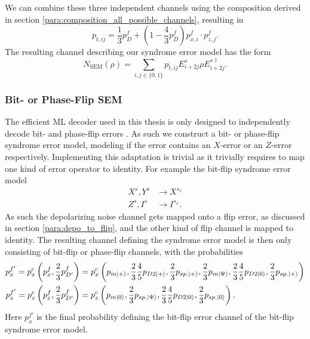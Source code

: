 We can combine these three independent channels using the composition derived in section \ref{para:composition_all_possible_channels}, resulting in 
\begin{equation}
    p_{t,ij} = \frac{1}{3} p_D^f + \left( 1- \frac{4}{3} p_D^f \right) p_{x,i}^f \cdot p_{z,j}^f.
    \label{eq:sem_final_correlated_sem_probs_short}
\end{equation}
The resulting channel describing our syndrome error model has the form
\begin{equation}
    N_{\mathrm{SEM}}(\rho) = \sum_{i,j\in \{0,1\}} p_{t,ij} E_{i+2j}^s \rho E_{i+2j}^{s\dag}.
\end{equation}




\subsubsection{Bit- or Phase-Flip SEM}\label{sssec:sem_results_bit_phase_flip}

The efficient ML decoder used in this thesis is only designed to independently decode bit- and phase-flip errors \cite{efficient_decoding_algorithm}.
As such we construct a bit- or phase-flip syndrome error model, modeling if the error contains an $X$-error or an $Z$-error respectively.
Implementing this adaptation is trivial as it trivially requires to map one kind of error operator to identity.
For example the bit-flip syndrome error model 
\begin{align*}
    X^s, Y^s &\rightarrow X^{s_x}\\
    Z^s, I^s &\rightarrow I^{s_x}.
\end{align*}
As such the depolarizing noise channel gets mapped onto a flip error, as discussed in section \ref{para:depo_to_flip}, 
and the other kind of flip channel is mapped to identity. 
The resulting channel defining the syndrome error model is then only consisting of bit-flip or phase-flip channels, with the probabilities 
\begin{align}
    p^{f'}_x= p^{c}_x \left(p^{f}_x, \frac{2}{3}p^{f}_{D'}\right) &=p^{c}_x \left(p_{m\ket{+}}, \frac{2}{3}\frac{4}{5}p_{D2\ket{+}},\frac{2}{3}p_{sp.\ket{+}}, \frac{2}{3}p_{m\ket{\Psi}}, \frac{2}{3}\frac{4}{5}p_{D2\ket{0}},\frac{2}{3}p_{sp.\ket{+}}\right) \\
    p^{f'}_z= p^{c}_z \left(p^{f}_z, \frac{2}{3}p^{f}_{D'}\right) &=p^{c}_z \left(p_{m\ket{0}},\frac{2}{3}p_{sp.\ket{\Psi}}, \frac{2}{3}\frac{4}{5}p_{D2\ket{0}},\frac{2}{3}p_{sp.\ket{0}} \right)   .
\end{align}
Here $p^{f'}_x$ is the final probability defining the bit-flip error channel of the bit-flip syndrome error model.

